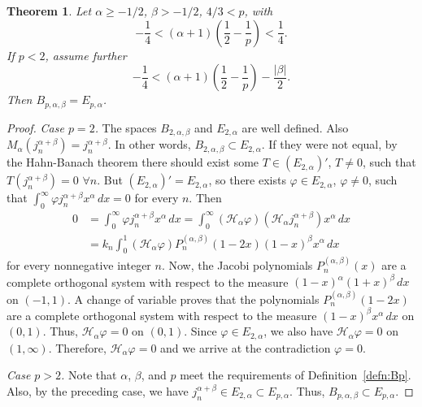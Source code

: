 \documentclass[reqno]{amsart}
\theoremstyle{plain}
\newtheorem{Thm}{Theorem}
\theoremstyle{definition}
\theoremstyle{remark}
\newcommand{\htr}{\mathcal{H}_\alpha} %
\begin{document}
\begin{Thm}
\label{th:Bp=Ep}
Let $\alpha\ge-1/2$, $\beta > -1/2$, $4/3 < p$, with
\begin{equation*}
   -\frac14 < (\alpha+1) \left( \frac12 - \frac1p \right) < \frac14.
\end{equation*}
If $p < 2$, assume further
\begin{equation*}
   -\frac14 < (\alpha+1) \left(\frac12 - \frac1p \right) - \frac{|\beta|} 2. 
\end{equation*}
Then $B_{p,\alpha,\beta} = E_{p,\alpha}$.
\end{Thm}
   
\begin{proof}
{\it Case $p=2$.} The spaces $B_{2,\alpha,\beta}$ and $E_{2,\alpha}$
are well defined. Also $M_\alpha(j_n^{\alpha+\beta}) = j_n^{\alpha+\beta}$. In
other words, $B_{2,\alpha,\beta} \subset E_{2,\alpha}$. If they were not
equal, by the Hahn-Banach theorem there should exist some $T \in
(E_{2,\alpha})'$, $T \ne 0$, such that $T(j_n^{\alpha+\beta}) = 0$ $\forall
n$. But $(E_{2,\alpha})' = E_{2,\alpha}$, so there exists $\varphi \in
E_{2,\alpha}$, $\varphi\ne0$, such that $\int_0^\infty \varphi
j_n^{\alpha+\beta} x^\alpha \, dx = 0$ for every
$n$. Then
\begin{align*}
    0 &= \int_0^\infty \varphi j_n^{\alpha+\beta} x^\alpha \, dx
    = \int_0^\infty (\htr \varphi) (\htr j_n^{\alpha+\beta}) x^\alpha \, dx \\
    &= k_n \int_0^1 (\htr \varphi) P_n^{(\alpha,\beta)}(1-2x)
      (1-x)^\beta x^\alpha \, dx
\end{align*}
for every nonnegative integer $n$. Now, the Jacobi polynomials
$P_n^{(\alpha,\beta)}(x)$ are a complete orthogonal system with respect to the
measure $(1-x)^\alpha(1+x)^\beta \, dx$ on $(-1,1)$. A change of variable
proves that the polynomials $P_n^{(\alpha,\beta)}(1-2x)$ are a complete
orthogonal system with respect to the measure $(1-x)^\beta x^\alpha \, dx$ on
$(0,1)$. Thus, $\htr \varphi = 0$ on $(0,1)$. Since $\varphi \in
E_{2,\alpha}$, we also have $\htr \varphi = 0$ on $(1,\infty)$. Therefore,
$\htr \varphi = 0$ and we arrive at the contradiction $\varphi = 0$.

{\it Case $p>2$.} Note that $\alpha$, $\beta$, and $p$ meet the
requirements of Definition~\ref{defn:Bp}. Also, by the preceding case, we
have $j_n^{\alpha+\beta}\in E_{2,\alpha} \subset E_{p,\alpha}$. Thus,
$B_{p,\alpha,\beta}\subset E_{p,\alpha}$.


\end{proof}
\end{document}
